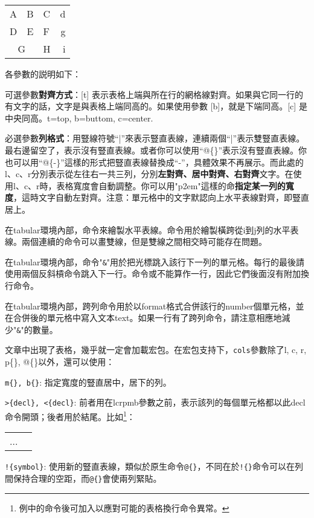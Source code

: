 \begin{codeshow}
\begin{center}
  \begin{tabular}[c]{|l|c||p{3em}
    r@{-}} \hline\hline
    A & B & C & d\\D & E & F & g\\
    \cline{1-2}
    \multicolumn{2}{|c|}{G}&H&i\\
    \hline
  \end{tabular}
\end{center}
\end{codeshow}

各參數的説明如下：
\begin{feai}
\item 可選參數\textbf{對齊方式}：[t] 表示表格上端與所在行的網格線對齊。如果與它同一行的有文字的話，文字是與表格上端同高的。如果使用參數 [b]，就是下端同高。[c] 是中央同高。t=top, b=buttom, c=center.
\item 必選參數\textbf{列格式}：用豎線符號“|”來表示豎直表線，連續兩個“|”表示雙豎直表線。最右邊留空了，表示沒有豎直表線。或者你可以使用“@\{\}”表示沒有豎直表線。你也可以用“@\{-\}”這樣的形式把豎直表線替換成“-”，具體效果不再展示。而此處的l、c、r分別表示從左往右一共三列，分別\textbf{左對齊、居中對齊、右對齊}文字。在使用l、c、r時，表格寬度會自動調整。你可以用"p{2em}"這樣的命\textbf{指定某一列的寬度}，這時文字自動左對齊。注意：單元格中的文字默認向上水平表線對齊，即豎直居上。
\item 在tabular環境內部，命令來繪製水平表線。命令用於繪製橫跨從i到j列的水平表線。兩個連續的命令可以畫雙線，但是雙線之間相交時可能存在問題。
\item 在tabular環境內部，命令"\texttt{\&}"用於把光標跳入該行下一列的單元格。每行的最後請使用兩個反斜槓命令跳入下一行。命令或不能算作一行，因此它們後面沒有附加換行命令。
\item 在tabular環境內部，跨列命令用於以format格式合併該行的number個單元格，並在合併後的單元格中寫入文本text。如果一行有了跨列命令，請注意相應地減少"\texttt{\&}"的數量。
\end{feai}

文章中出現了表格，幾乎就一定會加載宏包。在宏包支持下，\texttt{cols}參數除了l, c, r, p\{\}, @\{\}以外，還可以使用：
\begin{feai}
\item \texttt{m\{\}, b\{\}}: 指定寬度的豎直居中，居下的列。
\item \verb|>{decl}, <{decl}|: 前者用在lcrpmb參數之前，表示該列的每個單元格都以此decl命令開頭；後者用於結尾。比如\footnote{例中的命令後可加入以應對可能的表格換行命令異常。}：
\begin{latex}
\begin{tabular}{|>{\centering\ttfamily}p{5em}
    |>{$}c<{$}|}
...
\end{tabular}
\end{latex}
\item \verb|!{symbol}|:  使用新的豎直表線，類似於原生命令\texttt{@\{\}}，不同在於\verb|!{}|命令可以在列間保持合理的空距，而\verb|@{}|會使兩列緊貼。
\end{feai}

